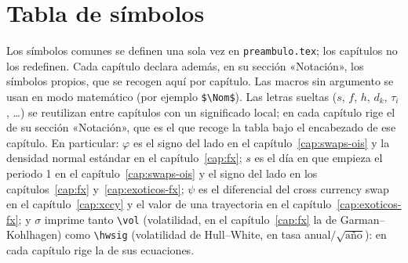 \chapter{Tabla de símbolos}\label{ap:simbolos}

Los símbolos comunes se definen una sola vez en \texttt{preambulo.tex}; los capítulos no los redefinen. Cada capítulo declara además, en su sección «Notación», los símbolos propios, que se recogen aquí por capítulo. Las macros sin argumento se usan en modo matemático (por ejemplo \texttt{\$\textbackslash Nom\$}). Las letras sueltas ($s$, $f$, $h$, $d_k$, $\tau_i$, \ldots) se reutilizan entre capítulos con un significado local; en cada capítulo rige el de su sección «Notación», que es el que recoge la tabla bajo el encabezado de ese capítulo. En particular: $\varphi$ es el signo del lado en el capítulo~\ref{cap:swaps-ois} y la densidad normal estándar en el capítulo~\ref{cap:fx}; $s$ es el día en que empieza el periodo 1 en el capítulo~\ref{cap:swaps-ois} y el signo del lado en los capítulos~\ref{cap:fx} y~\ref{cap:exoticos-fx}; $\psi$ es el diferencial del cross currency swap en el capítulo~\ref{cap:xccy} y el valor de una trayectoria en el capítulo~\ref{cap:exoticos-fx}; y $\sigma$ imprime tanto \texttt{\textbackslash vol} (volatilidad, en el capítulo~\ref{cap:fx} la de Garman--Kohlhagen) como \texttt{\textbackslash hwsig} (volatilidad de Hull--White, en tasa anual$/\sqrt{\text{año}}$): en cada capítulo rige la de sus ecuaciones.

